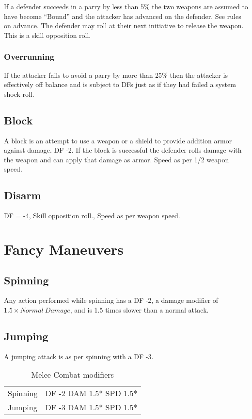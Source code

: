 If a defender succeeds in a parry by less than 5\% the two weapons are assumed
to have become ``Bound'' and the attacker has advanced on the defender. See rules
on advance. The defender may roll at their next initiative to release the weapon.
This is a skill opposition roll.

\subsubsection{Overrunning}

If the attacker fails to avoid a parry by more than 25\% then the
attacker is effectively off balance and is subject to DFs just as if
they had failed a system shock roll.

\subsection{Block}

A block is an attempt to use a weapon or a shield to provide addition
armor against damage. DF -2. If the block is successful the defender rolls
damage with the weapon and can apply that damage as armor. Speed as per
1/2 weapon speed.

\subsection{Disarm}
DF = -4, Skill opposition roll., Speed as per weapon speed.

\section{Fancy Maneuvers}

\subsection{Spinning}

Any action performed while spinning has a DF -2, a damage modifier
of \( 1.5 \times Normal\ Damage \), and is 1.5 times slower than a
normal attack.

\subsection{Jumping}

A jumping attack is as per spinning with a DF -3.

\begin{table}
	\begin{tabular}{ll}
	Spinning		 &		  DF -2 DAM 1.5* SPD 1.5* \\
	Jumping		&		  DF -3 DAM 1.5* SPD 1.5* \\
	\end{tabular}
    \caption{Melee Combat modifiers}
\end{table}

